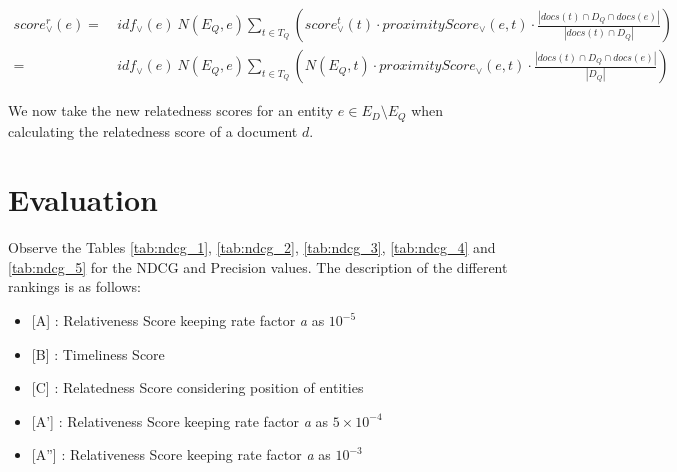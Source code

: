 \documentclass[10pt,a4paper]{article} %
\begin{document}
    \begin{equation}
    \begin{split}
     score^{r}_\vee(e) =  & ~ idf_\vee(e)~N(E_Q, e) \sum_{t \in T_Q}{(score^{t}_\vee(t) \cdot proximityScore_{\vee}(e, t) \cdot \frac{|docs(t) \cap D_Q \cap docs(e)|}{|docs(t) \cap D_Q|})} \\
    = & ~ idf_\vee(e)~N(E_Q, e) \sum_{t \in T_Q}{(N(E_Q, t) \cdot proximityScore_{\vee}(e, t) \cdot \frac{|docs(t) \cap D_Q \cap docs(e)|}{|D_Q|})}
    \end{split}
    \label{eq:relatednessScore}
    \end{equation}

    \noindent We now take the new relatedness scores for an entity $e \in E_D \setminus E_Q$ when calculating the 
    relatedness score of a document $d$. 
    
    \section{Evaluation}
    Observe the Tables \ref{tab:ndcg_1}, \ref{tab:ndcg_2}, \ref{tab:ndcg_3}, \ref{tab:ndcg_4} and 
    \ref{tab:ndcg_5} for the NDCG and Precision values. 
    The description of the different rankings is as follows: 
    \begin{itemize}
        \item {[}A{]} : Relativeness Score keeping rate factor {\em a} as $10^{-5}$
        \item {[}B{]} : Timeliness Score
        \item {[}C{]} : Relatedness Score considering position of entities
        \item {[}A'{]} : Relativeness Score keeping rate factor {\em a} as $5 \times 10^{-4}$
        \item {[}A''{]} : Relativeness Score keeping rate factor {\em a} as $10^{-3}$
    \end{itemize}
    
\end{document}
